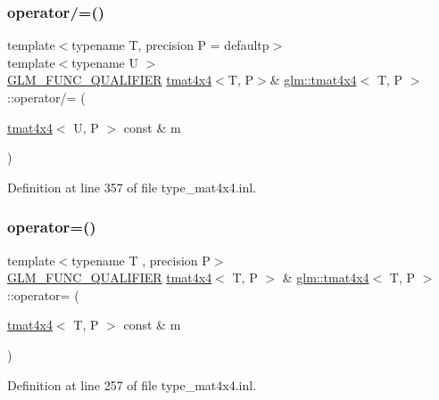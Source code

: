 \subsubsection{\texorpdfstring{operator/=()}{operator/=()}\hspace{0.1cm}{\footnotesize\ttfamily [4/4]}}
{\footnotesize\ttfamily template$<$typename T, precision P = defaultp$>$ \\
template$<$typename U $>$ \\
\mbox{\hyperlink{setup_8hpp_a33fdea6f91c5f834105f7415e2a64407}{G\+L\+M\+\_\+\+F\+U\+N\+C\+\_\+\+Q\+U\+A\+L\+I\+F\+I\+ER}} \mbox{\hyperlink{structglm_1_1tmat4x4}{tmat4x4}}$<$T, P$>$\& \mbox{\hyperlink{structglm_1_1tmat4x4}{glm\+::tmat4x4}}$<$ T, P $>$\+::operator/= (\begin{DoxyParamCaption}\item[{\mbox{\hyperlink{structglm_1_1tmat4x4}{tmat4x4}}$<$ U, P $>$ const \&}]{m }\end{DoxyParamCaption})}



Definition at line 357 of file type\+\_\+mat4x4.\+inl.

\mbox{\label{structglm_1_1tmat4x4_aeccf1c71ba2e06f4ce199da93767928e}} 
\subsubsection{\texorpdfstring{operator=()}{operator=()}\hspace{0.1cm}{\footnotesize\ttfamily [1/3]}}
{\footnotesize\ttfamily template$<$typename T , precision P$>$ \\
\mbox{\hyperlink{setup_8hpp_a33fdea6f91c5f834105f7415e2a64407}{G\+L\+M\+\_\+\+F\+U\+N\+C\+\_\+\+Q\+U\+A\+L\+I\+F\+I\+ER}} \mbox{\hyperlink{structglm_1_1tmat4x4}{tmat4x4}}$<$ T, P $>$ \& \mbox{\hyperlink{structglm_1_1tmat4x4}{glm\+::tmat4x4}}$<$ T, P $>$\+::operator= (\begin{DoxyParamCaption}\item[{\mbox{\hyperlink{structglm_1_1tmat4x4}{tmat4x4}}$<$ T, P $>$ const \&}]{m }\end{DoxyParamCaption})}



Definition at line 257 of file type\+\_\+mat4x4.\+inl.

\mbox{\label{structglm_1_1tmat4x4_af78f51e2bde3b85554c4f48bcca0cbf6}} 
